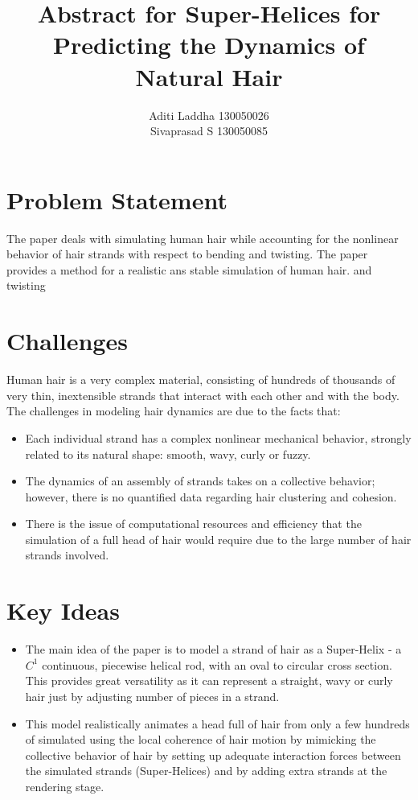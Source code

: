 \documentclass[paper=a4, fontsize=11pt]{scrartcl}
\title{Abstract for Super-Helices for Predicting the Dynamics of Natural Hair
}
\author{
		\normalsize Aditi Laddha 130050026\\
        \normalsize Sivaprasad S 130050085\\ \normalsize
}
\begin{document}
\maketitle
\section{Problem Statement}
The paper deals with simulating human hair while accounting for the nonlinear behavior of hair strands with respect to bending and twisting. The paper provides a method for a realistic ans stable  simulation of human hair. 
and twisting

\section{Challenges}
Human hair is a very complex material,
consisting of hundreds of thousands of very thin, inextensible
strands that interact with each other and with the body.
The challenges in modeling hair dynamics are due to the facts that:
\begin{itemize}
\item Each individual strand has a complex nonlinear mechanical behavior,
strongly related to its natural shape: smooth, wavy, curly or fuzzy.
\item The dynamics of an assembly of strands takes on a collective
behavior; however, there is no quantified data
regarding hair clustering and cohesion.
\item There is the issue of computational resources and efficiency that the simulation of a full head of hair would require due to the large number of hair strands involved.
\end{itemize}

\section{Key Ideas}
\begin{itemize}
\item The main idea of the paper is to model a strand of hair as a Super-Helix - a $C^1$
continuous, piecewise helical rod, with an oval to circular cross section. This provides great versatility as it can represent a straight, wavy or curly hair just by adjusting number of pieces in a strand. 
\item This model realistically animates a head full of hair
from only a few hundreds of simulated using 
the local coherence of hair motion by mimicking the collective behavior of hair by
setting up adequate interaction forces between the simulated strands
(Super-Helices) and by adding extra strands at the rendering stage.
\end{itemize}
\end{document}

